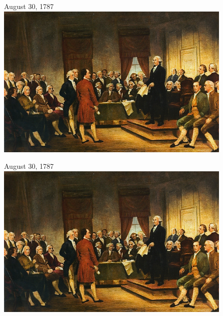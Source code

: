 \begin{frame}{August 30, 1787}
    \centering
    \includegraphics[width=0.85\textwidth]{img/convention.png} \\
\end{frame}

\begin{frame}{August 30, 1787}
    \centering
    \includegraphics[width=0.85\textwidth]{img/convention.png} \\
\end{frame}

